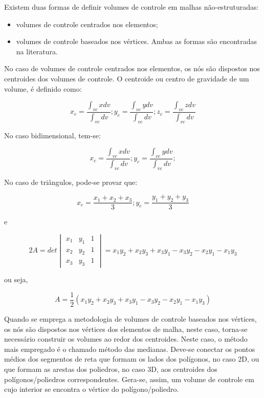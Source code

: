 Existem duas formas de definir volumes de controle em malhas não-estruturadas:
\begin{itemize}
    \item volumes de controle centrados nos elementos;
    \item volumes de controle baseados nos vértices. Ambas as formas são encontradas na literatura.
\end{itemize}

No caso de volumes de controle centrados nos elementos, os nós são dispostos nos centroides dos volumes de controle. O centroide ou centro de gravidade de um volume, é definido como:

\begin{equation}
    \label{eq:6.1}
    x_c = \frac{\int_{vc}x dv}{\int_{vc}dv};
    y_c = \frac{\int_{vc}y dv}{\int_{vc}dv};
    z_c = \frac{\int_{vc}z dv}{\int_{vc}dv}
\end{equation}

No caso bidimensional, tem-se:

\begin{equation}
    \label{eq:6.2}
    x_c = \frac{\int_{vc}x dv}{\int_{vc}dv};
    y_c = \frac{\int_{vc}y dv}{\int_{vc}dv};
\end{equation}

No caso de triângulos, pode-se provar que:

\begin{equation}
    \label{eq:6.3}
    x_c = \frac{x_1+x_2+x_3}{3};
    y_c = \frac{y_1+y_2+y_3}{3}
\end{equation}

e

\begin{equation*}
    2A = det \begin{vmatrix}
        x_1 & y_1 & 1\\
        x_2 & y_2 & 1\\
        x_3 & y_3 & 1
    \end{vmatrix}
    = x_1y_2 + x_2y_3 + x_3y_1 - x_3y_2 - x_2y_1 - x_1y_3
\end{equation*}

ou seja,

\begin{equation}
    \label{eq:6.4}
    A = \frac{1}{2}(x_1y_2 + x_2y_3 + x_3y_1 - x_3y_2 - x_2y_1 - x_1y_3)
\end{equation}

Quando se emprega a metodologia de volumes de controle baseados nos vértices, os nós são dispostos nos vértices dos elementos de malha, neste caso, torna-se necessário construir os volumes ao redor dos centroides. Neste caso, o método mais empregado é o chamado método das medianas. Deve-se conectar os pontos médios dos segmentos de reta que formam os lados dos polígonos, no caso 2D, ou que formam as arestas dos poliedros, no caso 3D, aos centroides dos polígonos/poliedros correspondentes. Gera-se, assim, um volume de controle em cujo interior se encontra o vértice do polígono/poliedro.

